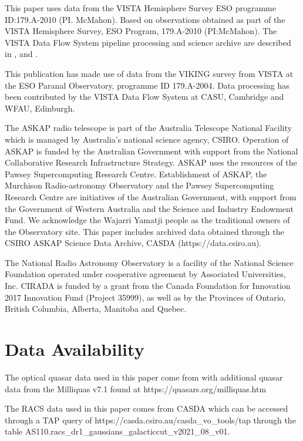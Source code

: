 \documentclass[a4paper,fleqn,usenatbib]{mnras}
\begin{document}
This paper uses data from the VISTA Hemisphere Survey ESO programme ID:179.A-2010 (PI. McMahon). Based on observations obtained as part of the VISTA Hemisphere Survey, ESO Program, 179.A-2010 (PI:McMahon). The VISTA Data Flow System pipeline processing and science archive are described in \citet{irwin04}, \citet{hambly08} and \citep{cross12}.

This publication has made use of data from the VIKING survey from VISTA at the ESO Paranal Observatory, programme ID 179.A-2004. Data processing has been contributed by the VISTA Data Flow System at CASU, Cambridge and WFAU, Edinburgh.

The ASKAP radio telescope is part of the Australia Telescope National Facility which is managed by Australia’s national science agency, CSIRO. Operation of ASKAP is funded by the Australian Government with support from the National Collaborative Research Infrastructure Strategy. ASKAP uses the resources of the Pawsey Supercomputing Research Centre. Establishment of ASKAP, the Murchison Radio-astronomy Observatory and the Pawsey Supercomputing Research Centre are initiatives of the Australian Government, with support from the Government of Western Australia and the Science and Industry Endowment Fund. We acknowledge the Wajarri Yamatji people as the traditional owners of the Observatory site. This paper includes archived data obtained through the CSIRO ASKAP Science Data Archive, CASDA (https://data.csiro.au).

The National Radio Astronomy Observatory is a facility of the National Science Foundation operated under cooperative agreement by Associated Universities, Inc. CIRADA is funded by a grant from the Canada Foundation for Innovation 2017 Innovation Fund (Project 35999), as well as by the Provinces of Ontario, British Columbia, Alberta, Manitoba and Quebec. 


\section*{Data Availability}

The optical quasar data used in this paper come from \cite{onken22} with additional quasar data from the Milliquas v7.1 \citet{flesch15} found at https://quasars.org/milliquas.htm

The RACS data used in this paper comes from CASDA which can be accessed through a TAP query of https://casda.csiro.au/casda\_vo\_tools/tap through the table AS110.racs\_dr1\_gaussians\_galacticcut\_v2021\_08\_v01.
\end{document}
